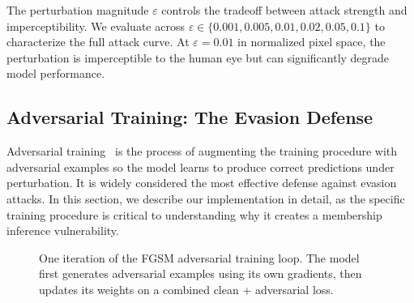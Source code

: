 \documentclass[conference]{IEEEtran}
\begin{document}
The perturbation magnitude $\varepsilon$ controls the tradeoff between attack strength and imperceptibility. We evaluate across $\varepsilon \in \{0.001, 0.005, 0.01, 0.02, 0.05, 0.1\}$ to characterize the full attack curve. At $\varepsilon = 0.01$ in normalized pixel space, the perturbation is imperceptible to the human eye but can significantly degrade model performance.


\subsection{Adversarial Training: The Evasion Defense}
\label{sec:adv_training_detail}

Adversarial training~\cite{goodfellow2015explaining, madry2018towards} is the process of augmenting the training procedure with adversarial examples so the model learns to produce correct predictions under perturbation. It is widely considered the most effective defense against evasion attacks. In this section, we describe our implementation in detail, as the specific training procedure is critical to understanding why it creates a membership inference vulnerability.

\begin{figure}[t]
    \centering
    \caption{One iteration of the FGSM adversarial training loop. The model first generates adversarial examples using its own gradients, then updates its weights on a combined clean + adversarial loss.}
    \label{fig:adv_training_loop}
\end{figure}
\end{document}
